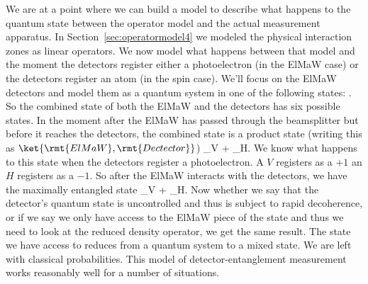 \begin{marginfigure}
\end{marginfigure}
We are at a point where we can build a model to describe what happens to the quantum state between the operator model and the actual measurement apparatus. In Section~\ref{sec:operatormodel4} we modeled the physical interaction zones as linear operators. We now model what happens between that model and the moment the detectors register either a photoelectron (in the ElMaW case) or the detectors register an atom (in the spin case). We'll focus on the ElMaW detectors and model them as a quantum system in one of the following states:
\beq
{}\rightarrow{}\quad{}\rightarrow {} \quad{}\rightarrow {}.
\eeq
So the combined state of both the ElMaW and the detectors has six possible states. In the moment after the ElMaW has passed through the beamsplitter but before it reaches the detectors, the combined state is a product state (writing this as $\ket{\rmt{ElMaW},\rmt{Dectector}}$)
\beq
\alpha_V  + \alpha_H.
\eeq
We know what happens to this state when the detectors register a photoelectron. A $V$ registers as a $+1$ an $H$ registers as a $-1$. So after the ElMaW interacts with the detectors, we have the maximally entangled state
\beq
\alpha_V  + \alpha_H.
\eeq
Now whether we say that the detector's quantum state is uncontrolled and thus is subject to rapid decoherence, or if we say we only have access to the ElMaW piece of the state and thus we need to look at the reduced density operator, we get the same result. The state we have access to reduces from a quantum system to a mixed state. We are left with classical probabilities. This model of detector-entanglement measurement works reasonably well for a number of situations. 


